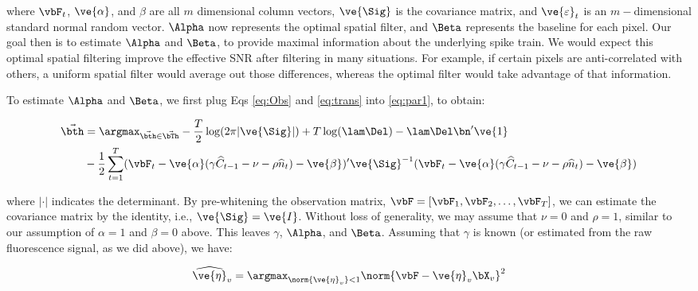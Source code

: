 \documentclass[12pt]{article}
\newcommand{\hC}{\widehat{C}}
\newcommand{\hn}{\widehat{n}}
\begin{document}
\noindent where $\vbF_t$, $\ve{\alpha}$, and $\beta$ are all $m$ dimensional column vectors, $\ve{\Sig}$ is the covariance matrix, and $\ve{\varepsilon}_t$ is an $m-$dimensional standard normal random vector. $\Alpha$ now represents the optimal spatial filter, and $\Beta$ represents the baseline for each pixel.  Our goal then is to estimate $\Alpha$ and $\Beta$, to provide maximal information about the underlying spike train.  We would expect this optimal spatial filtering improve the effective SNR after filtering in many situations.  For example, if certain pixels are anti-correlated with others, a uniform spatial filter would average out those differences, whereas the optimal filter would take advantage of that information.    

To estimate $\Alpha$ and $\Beta$, we first plug 
Eqs \eqref{eq:Obs} and \eqref{eq:trans} into \eqref{eq:par1}, to obtain:

\begin{align} 
\vec{\bth} &=\argmax_{\vec{\bth} \in \vec{\bTh}} - \frac{T}{2} \log (2\pi|\ve{\Sig}|) + T\log (\lam \Del) -  \lam \Del \bn' \ve{1} \nonumber\\
&-\frac{1}{2} \sum_{t=1}^T (\vbF_t - \ve{\alpha} (\gamma \hC_{t-1} -\nu  - \rho \hn_t) - \ve{\beta})' \ve{\Sig}^{-1} (\vbF_t - \ve{\alpha} (\gamma \hC_{t-1} -\nu  - \rho \hn_t) - \ve{\beta}) %
\end{align} 

\noindent where $| \cdot |$ indicates the determinant. By pre-whitening the observation matrix, $\vbF=[\vbF_1, \vbF_2, \ldots, \vbF_T]$, we can estimate the covariance matrix by the identity, i.e., $\ve{\Sig}=\ve{I}$.   Without loss of generality, we may assume that $\nu=0$ and $\rho=1$, similar to our assumption of $\alpha=1$ and $\beta=0$ above. This leaves $\gamma$, $\Alpha$, and $\Beta$. Assuming that $\gamma$ is known (or estimated from the raw fluorescence signal, as we did above), we have: 

\begin{align}
\widehat{\ve{\eta}}_v = \argmax_{\norm{\ve{\eta}_v} <1} \norm{\vbF - \ve{\eta}_v \bX_v}^2 \label{eq:Par}
\end{align}
\end{document}
